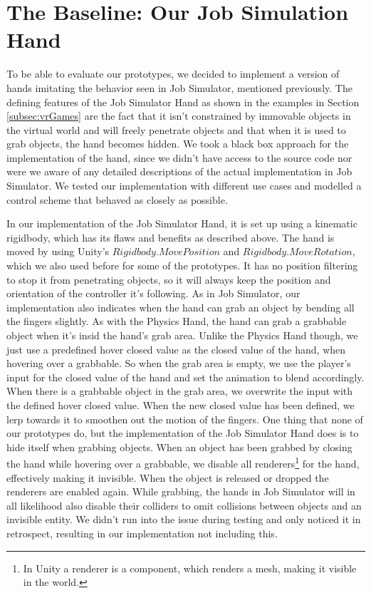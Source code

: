 \section{The Baseline: Our Job Simulation Hand}
To be able to evaluate our prototypes, we decided to implement a version of hands imitating the behavior seen in Job Simulator, mentioned previously. The defining features of the Job Simulator Hand as shown in the examples in Section \ref{subsec:vrGames} are the fact that it isn't constrained by immovable objects in the virtual world and will freely penetrate objects and that when it is used to grab objects, the hand becomes hidden. We took a black box approach for the implementation of the hand, since we didn't have access to the source code nor were we aware of any detailed descriptions of the actual implementation in Job Simulator. We tested our implementation with different use cases and modelled a control scheme that behaved as closely as possible.

In our implementation of the Job Simulator Hand, it is set up using a kinematic rigidbody, which has its flaws and benefits as described above. The hand is moved by using Unity's $Rigidbody.MovePosition$ and $Rigidbody.MoveRotation$, which we also used before for some of the prototypes. It has no position filtering to stop it from penetrating objects, so it will always keep the position and orientation of the controller it's following. As in Job Simulator, our implementation also indicates when the hand can grab an object by bending all the fingers slightly. As with the Physics Hand, the hand can grab a grabbable object when it's insid the hand's grab area. Unlike the Physics Hand though, we just use a predefined hover closed value as the closed value of the hand, when hovering over a grabbable. So when the grab area is empty, we use the player's input for the closed value of the hand and set the animation to blend accordingly. When there is a grabbable object in the grab area, we overwrite the input with the defined hover closed value. When the new closed value has been defined, we lerp towards it to smoothen out the motion of the fingers. One thing that none of our prototypes do, but the implementation of the Job Simulator Hand does is to hide itself when grabbing objects. When an object has been grabbed by closing the hand while hovering over a grabbable, we disable all renderers\footnote{In Unity a renderer is a component, which renders a mesh, making it visible in the world.} for the hand, effectively making it invisible. When the object is released or dropped the renderers are enabled again. While grabbing, the hands in Job Simulator will in all likelihood also disable their colliders to omit collisions between objects and an invisible entity. We didn't run into the issue during testing and only noticed it in retrospect, resulting in our implementation not including this.

